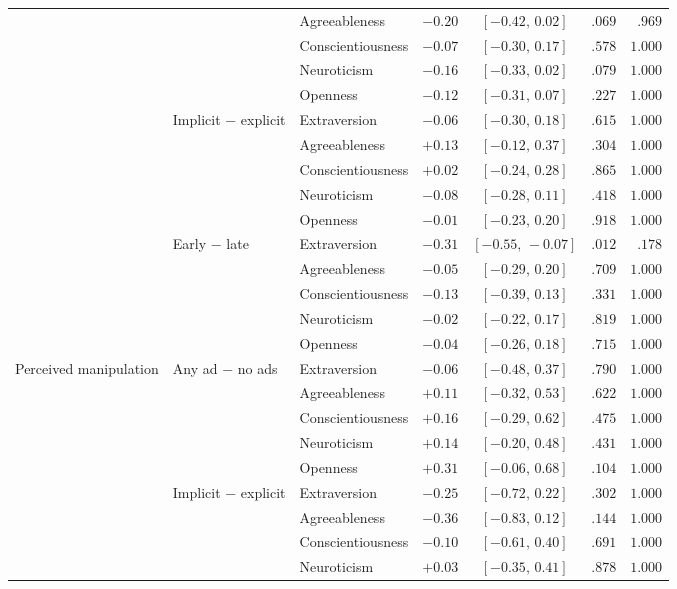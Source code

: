 \begin{table}[H]
\begin{tabular}{@{}ll l r c r r@{}}
 &  & Agreeableness & $-0.20$ & $[-0.42,\,0.02]$ & $.069$ & $.969$ \\
 &  & Conscientiousness & $-0.07$ & $[-0.30,\,0.17]$ & $.578$ & $1.000$ \\
 &  & Neuroticism & $-0.16$ & $[-0.33,\,0.02]$ & $.079$ & $1.000$ \\
 &  & Openness & $-0.12$ & $[-0.31,\,0.07]$ & $.227$ & $1.000$ \\
 & Implicit − explicit & Extraversion & $-0.06$ & $[-0.30,\,0.18]$ & $.615$ & $1.000$ \\
 &  & Agreeableness & $+0.13$ & $[-0.12,\,0.37]$ & $.304$ & $1.000$ \\
 &  & Conscientiousness & $+0.02$ & $[-0.24,\,0.28]$ & $.865$ & $1.000$ \\
 &  & Neuroticism & $-0.08$ & $[-0.28,\,0.11]$ & $.418$ & $1.000$ \\
 &  & Openness & $-0.01$ & $[-0.23,\,0.20]$ & $.918$ & $1.000$ \\
 & Early − late & Extraversion & $-0.31$ & $[-0.55,\,-0.07]$ & $.012$ & $.178$ \\
 &  & Agreeableness & $-0.05$ & $[-0.29,\,0.20]$ & $.709$ & $1.000$ \\
 &  & Conscientiousness & $-0.13$ & $[-0.39,\,0.13]$ & $.331$ & $1.000$ \\
 &  & Neuroticism & $-0.02$ & $[-0.22,\,0.17]$ & $.819$ & $1.000$ \\
 &  & Openness & $-0.04$ & $[-0.26,\,0.18]$ & $.715$ & $1.000$ \\
\midrule
Perceived manipulation & Any ad − no ads & Extraversion & $-0.06$ & $[-0.48,\,0.37]$ & $.790$ & $1.000$ \\
 &  & Agreeableness & $+0.11$ & $[-0.32,\,0.53]$ & $.622$ & $1.000$ \\
 &  & Conscientiousness & $+0.16$ & $[-0.29,\,0.62]$ & $.475$ & $1.000$ \\
 &  & Neuroticism & $+0.14$ & $[-0.20,\,0.48]$ & $.431$ & $1.000$ \\
 &  & Openness & $+0.31$ & $[-0.06,\,0.68]$ & $.104$ & $1.000$ \\
 & Implicit − explicit & Extraversion & $-0.25$ & $[-0.72,\,0.22]$ & $.302$ & $1.000$ \\
 &  & Agreeableness & $-0.36$ & $[-0.83,\,0.12]$ & $.144$ & $1.000$ \\
 &  & Conscientiousness & $-0.10$ & $[-0.61,\,0.40]$ & $.691$ & $1.000$ \\
 &  & Neuroticism & $+0.03$ & $[-0.35,\,0.41]$ & $.878$ & $1.000$ \\

\end{tabular}
\end{table}
